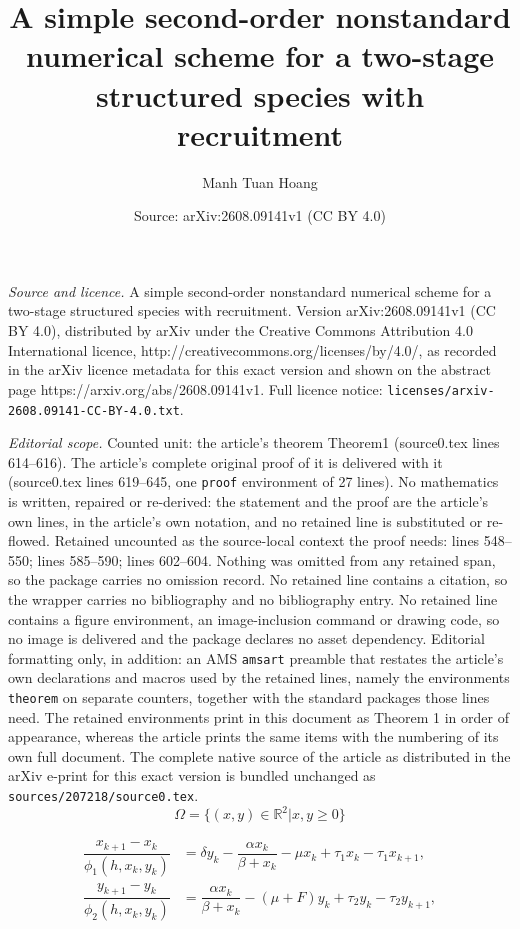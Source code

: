 \documentclass[10pt,a4paper]{amsart}
\title{A simple second-order nonstandard numerical scheme for a two-stage structured species with recruitment}
\author{Manh Tuan Hoang}
\date{Source: arXiv:2608.09141v1 (CC BY 4.0)}
\begin{document}
\maketitle

\noindent\emph{Source and licence.} A simple second-order nonstandard numerical scheme for a two-stage structured species with recruitment. Version arXiv:2608.09141v1 (CC BY 4.0), distributed by arXiv under the Creative Commons Attribution 4.0 International licence, http://creativecommons.org/licenses/by/4.0/, as recorded in the arXiv licence metadata for this exact version and shown on the abstract page https://arxiv.org/abs/2608.09141v1. Full licence notice: \texttt{licenses/arxiv-2608.09141-CC-BY-4.0.txt}.\par\smallskip

\noindent\textit{Editorial scope.} Counted unit: the article's theorem Theorem1 (source0.tex lines 614--616). The article's complete original proof of it is delivered with it (source0.tex lines 619--645, one \texttt{proof} environment of 27 lines). No mathematics is written, repaired or re-derived: the statement and the proof are the article's own lines, in the article's own notation, and no retained line is substituted or re-flowed.  Retained uncounted as the source-local context the proof needs: lines 548--550; lines 585--590; lines 602--604.  Nothing was omitted from any retained span, so the package carries no omission record.  No retained line contains a citation, so the wrapper carries no bibliography and no bibliography entry.  No retained line contains a figure environment, an image-inclusion command or drawing code, so no image is delivered and the package declares no asset dependency.  Editorial formatting only, in addition: an AMS \texttt{amsart} preamble that restates the article's own declarations and macros used by the retained lines, namely the environments \texttt{theorem} on separate counters, together with the standard packages those lines need.  The retained environments print in this document as Theorem 1 in order of appearance, whereas the article prints the same items with the numbering of its own full document.  The complete native source of the article as distributed in the arXiv e-print for this exact version is bundled unchanged as \texttt{sources/207218/source0.tex}.
\begin{equation}\label{eq:3a}
\Omega = \{(x, y) \in \mathbb{R}^2|x, y \geq 0\}
\end{equation}

\begin{equation}\label{eq:NSFD}
\begin{split}
\dfrac{x_{k+1}- x_k}{\phi_1(h, x_k, y_k)} &= \delta y_k - \dfrac{\alpha x_{k}}{\beta + x_k}- \mu x_{k} + \tau_1x_k - \tau_1x_{k+1}, \\
\dfrac{y_{k+1} - y_k}{\phi_2(h, x_k, y_k)} &= \dfrac{\alpha x_{k}}{\beta + x_k} - (\mu+F) y_{k} + \tau_2y_k - \tau_2y_{k+1},
\end{split}
\end{equation}
\end{document}
